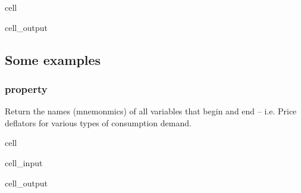 \documentclass[letterpaper,10pt,english]{jupyterBook}
\begin{document}
\begin{sphinxuseclass}{cell}
\begin{sphinxVerbatimOutput}
\begin{sphinxuseclass}{cell_output}
\begin{sphinxVerbatim}
\end{sphinxVerbatim}

\end{sphinxuseclass}\end{sphinxVerbatimOutput}

\end{sphinxuseclass}

\subsection{Some examples}
\label{\detokenize{content/05_WBModels/LoadingWBModel:some-examples}}

\subsubsection{ property}
\label{\detokenize{content/05_WBModels/LoadingWBModel:names-property}}
\sphinxAtStartPar
{}

\sphinxAtStartPar
Return the names (mnemonmics) of all variables that begin  and end  – i.e. Price deflators for various types of consumption demand.

\begin{sphinxuseclass}{cell}\begin{sphinxVerbatimInput}

\begin{sphinxuseclass}{cell_input}
\begin{sphinxVerbatim}[commandchars=\\\{\}]
\PYG{p}{[}\PYG{p}{]}
\end{sphinxVerbatim}

\end{sphinxuseclass}\end{sphinxVerbatimInput}
\begin{sphinxVerbatimOutput}

\begin{sphinxuseclass}{cell_output}
\begin{sphinxVerbatim}
\end{sphinxVerbatim}

\end{sphinxuseclass}\end{sphinxVerbatimOutput}

\end{sphinxuseclass}
\end{document}
